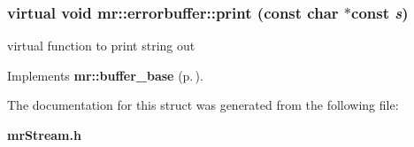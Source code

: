 \subsubsection{\setlength{\rightskip}{0pt plus 5cm}virtual void mr::errorbuffer::print (const char $\ast$const {\em s})\hspace{0.3cm}{\tt  [inline, virtual]}}\label{structmr_1_1errorbuffer_a1}


virtual function to print string out 



Implements {\bf mr::buffer\_\-base} {\rm (p.\,\pageref{structmr_1_1buffer__base_a3})}.

The documentation for this struct was generated from the following file:\begin{CompactItemize}
\item 
{\bf mr\-Stream.h}\end{CompactItemize}
